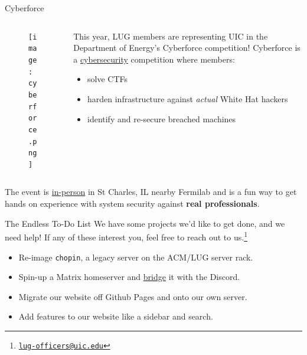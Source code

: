 \documentclass{beamer}
\begin{document}
\begin{frame}{Cyberforce}
	\begin{columns}
		\begin{column}{0.4\textwidth}
			\begin{figure}
				\centering
				\texttt{[image: cyberforce.png]}
			\end{figure}
		\end{column}
		\begin{column}{0.6\textwidth}
			This year, LUG members are representing UIC in the
			Department of Energy's Cyberforce competition!
			\pause
			Cyberforce is a \underline{cybersecurity} competition
			where members:
			\begin{itemize}
				\item solve CTFs
				      \pause
				\item harden infrastructure against
				      \textit{actual} White Hat hackers
				      \pause
				\item identify and re-secure breached machines
				      \pause
			\end{itemize}
		\end{column}
	\end{columns}

	\vspace{0.3cm}

	The event is \underline{in-person} in St Charles, IL nearby Fermilab
	and is a fun way to get hands on experience with system security
	against \textbf{real professionals}.
\end{frame}

\begin{frame}{The Endless To-Do List}
	We have some projects we'd like to get done, and we need help! If any
	of these interest you, feel free to reach out to us.\footnote{
		\href{mailto:lug-officers@uic.edu}{\texttt{lug-officers@uic.edu}}}
	\pause

	\begin{itemize}
		\item Re-image \texttt{chopin}, a legacy server on the ACM/LUG
		      server rack.
		\item Spin-up a Matrix homeserver and \underline{bridge} it
		      with the Discord.
		\item Migrate our website off Github Pages and onto our own
		      server.
		\item Add features to our website like a sidebar and search.
	\end{itemize}
\end{frame}
\end{document}
